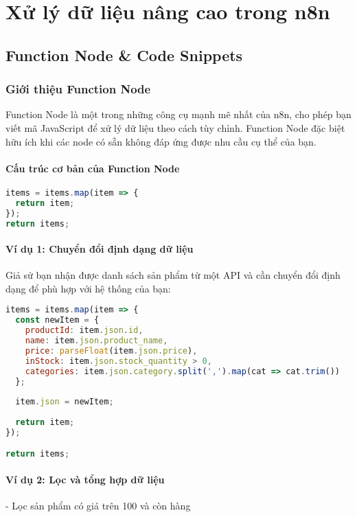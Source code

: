 \chapter{Xử lý dữ liệu nâng cao trong n8n}

\section{Function Node \& Code Snippets}

\subsection{Giới thiệu Function Node}

Function Node là một trong những công cụ mạnh mẽ nhất của n8n, cho phép bạn viết mã JavaScript để xử lý dữ liệu theo cách tùy chỉnh. Function Node đặc biệt hữu ích khi các node có sẵn không đáp ứng được nhu cầu cụ thể của bạn.

\subsubsection{Cấu trúc cơ bản của Function Node}

\begin{lstlisting}[language=JavaScript]
items = items.map(item => {
  return item;
});
return items;
\end{lstlisting}

\subsubsection{Ví dụ 1: Chuyển đổi định dạng dữ liệu}

Giả sử bạn nhận được danh sách sản phẩm từ một API và cần chuyển đổi định dạng để phù hợp với hệ thống của bạn:

\begin{lstlisting}[language=JavaScript]
items = items.map(item => {
  const newItem = {
    productId: item.json.id,
    name: item.json.product_name,
    price: parseFloat(item.json.price),
    inStock: item.json.stock_quantity > 0,
    categories: item.json.category.split(',').map(cat => cat.trim())
  };
  
  item.json = newItem;
  
  return item;
});

return items;
\end{lstlisting}

\subsubsection{Ví dụ 2: Lọc và tổng hợp dữ liệu}
- Lọc sản phẩm có giá trên 100 và còn hàng

